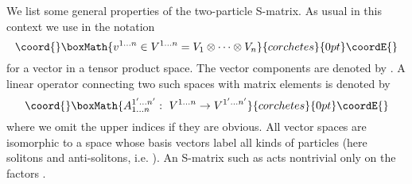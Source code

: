 \documentclass[a4paper,a4paper]{article}
\begin{document}
We list some general properties of the two-particle S-matrix. As usual in
this context we use in the notation 
\[\coord{}\boxMath{
v^{1\dots n}\in V^{1\dots n}=V_{1}\otimes \cdots \otimes V_{n} 
}{corchetes}{0pt}\coordE{}\]
for a vector in a tensor product space. The vector components are denoted by 
\coordHE{}. A linear operator connecting two such
spaces with matrix elements \coordHE{} is denoted by 
\[\coord{}\boxMath{
A_{1\dots n}^{1^{\prime }\dots n^{\prime }}:~V^{1\dots n}\to V^{1^{\prime
}\dots n^{\prime }} 
}{corchetes}{0pt}\coordE{}\]
where we omit the upper indices if they are obvious. All vector spaces \coordHE{} are isomorphic to a space \coordHE{} whose basis vectors label all kinds of
particles (here solitons and anti-solitons, i.e. \coordHE{}). An
S-matrix such as \coordHE{} acts nontrivial only on the factors \coordHE{}.
\end{document}
